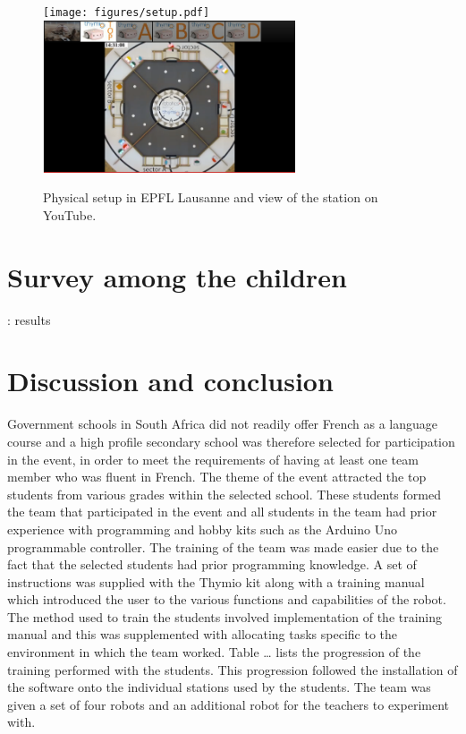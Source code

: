 \documentclass{intech-journal}
\begin{document}
\begin{figure}[ht]
 \centering
    \texttt{[image: figures/setup.pdf]}
    \includegraphics[height=45mm]{figures/youtube-view.png}
  \caption{Physical setup in EPFL Lausanne and view of the station on YouTube.}
  \label{fig:setup-physical} 
\end{figure}


\section{Survey among the children}: results

\section{Discussion and conclusion}
Government schools in South Africa did not readily offer French as a language course and a high profile secondary school was therefore selected for participation in the event, in order to meet the requirements of having at least one team member who was fluent in French. The theme of the event attracted the top students from various grades within the selected school. These students formed the team that participated in the event and all students in the team had prior experience with programming and hobby kits such as the Arduino Uno programmable controller. 
The training of the team was made easier due to the fact that the selected students had prior programming knowledge. A set of instructions was supplied with the Thymio kit along with a training manual which introduced the user to the various functions and capabilities of the robot. The method used to train the students involved implementation of the training manual and this was supplemented with allocating tasks specific to the environment in which the team worked. Table … lists the progression of the training performed with the students. This progression followed the installation of the software onto the individual stations used by the students. The team was given a set of four robots and an additional robot for the teachers to experiment with. 
\end{document}
